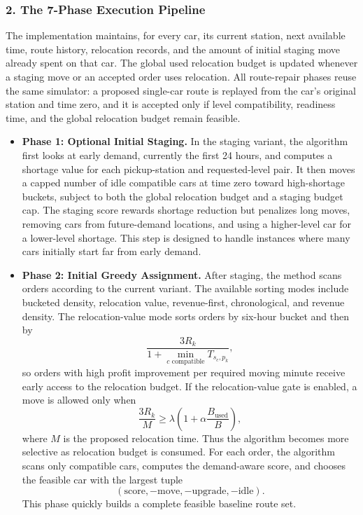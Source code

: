 \documentclass[10pt,a4paper]{article}
\begin{document}
\subsubsection*{2. The 7-Phase Execution Pipeline}

The implementation maintains, for every car, its current station, next available
time, route history, relocation records, and the amount of initial staging move
already spent on that car.  The global used relocation budget is updated whenever
a staging move or an accepted order uses relocation.  All route-repair phases
reuse the same simulator: a proposed single-car route is replayed from the car's
original station and time zero, and it is accepted only if level compatibility,
readiness time, and the global relocation budget remain feasible.

\begin{itemize}
    \item \textbf{Phase 1: Optional Initial Staging.} In the staging variant, the
    algorithm first looks at early demand, currently the first 24 hours, and
    computes a shortage value for each pickup-station and requested-level pair.
    It then moves a capped number of idle compatible cars at time zero toward
    high-shortage buckets, subject to both the global relocation budget and a
    staging budget cap.  The staging score rewards shortage reduction but
    penalizes long moves, removing cars from future-demand locations, and using
    a higher-level car for a lower-level shortage.  This step is designed to
    handle instances where many cars initially start far from early demand.

    \item \textbf{Phase 2: Initial Greedy Assignment.} After staging, the method
    scans orders according to the current variant.  The available sorting modes
    include bucketed density, relocation value, revenue-first, chronological,
    and revenue density.  The relocation-value mode sorts orders by six-hour
    bucket and then by
    \[
    \frac{3R_k}{1+\min_{c\text{ compatible}}T_{s_c,p_k}},
    \]
    so orders with high profit improvement per required moving minute receive
    early access to the relocation budget.  If the relocation-value gate is
    enabled, a move is allowed only when
    \[
    \frac{3R_k}{M}\ge
    \lambda\left(1+\alpha\frac{B_{\text{used}}}{B}\right),
    \]
    where $M$ is the proposed relocation time.  Thus the algorithm becomes more
    selective as relocation budget is consumed.  For each order, the algorithm
    scans only compatible cars, computes the demand-aware score, and chooses the
    feasible car with the largest tuple
    \[
    (\text{score},-\text{move},-\text{upgrade},-\text{idle}).
    \]
    This phase quickly builds a complete feasible baseline route set.


\end{itemize}
\end{document}

